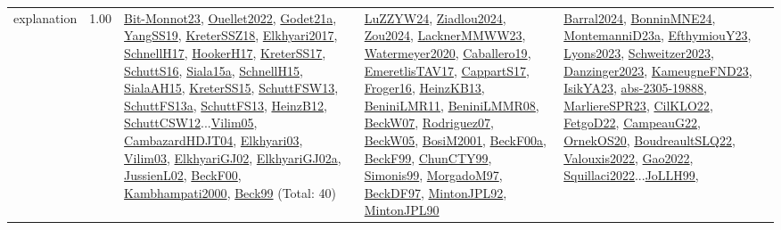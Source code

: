 {\begin{longtable}{p{3cm}r>{\raggedright\arraybackslash}p{6cm}>{\raggedright\arraybackslash}p{6cm}>{\raggedright\arraybackslash}p{8cm}}
\index{explanation}\index{Concepts!explanation}explanation &  1.00 & \hyperref[detail:Bit-Monnot23]{Bit-Monnot23}, \hyperref[detail:Ouellet2022]{Ouellet2022}, \hyperref[detail:Godet21a]{Godet21a}, \hyperref[detail:YangSS19]{YangSS19}, \hyperref[detail:KreterSSZ18]{KreterSSZ18}, \hyperref[detail:Elkhyari2017]{Elkhyari2017}, \hyperref[detail:SchnellH17]{SchnellH17}, \hyperref[detail:HookerH17]{HookerH17}, \hyperref[detail:KreterSS17]{KreterSS17}, \hyperref[detail:SchuttS16]{SchuttS16}, \hyperref[detail:Siala15a]{Siala15a}, \hyperref[detail:SchnellH15]{SchnellH15}, \hyperref[detail:SialaAH15]{SialaAH15}, \hyperref[detail:KreterSS15]{KreterSS15}, \hyperref[detail:SchuttFSW13]{SchuttFSW13}, \hyperref[detail:SchuttFS13a]{SchuttFS13a}, \hyperref[detail:SchuttFS13]{SchuttFS13}, \hyperref[detail:HeinzB12]{HeinzB12}, \hyperref[detail:SchuttCSW12]{SchuttCSW12}...\hyperref[detail:Vilim05]{Vilim05}, \hyperref[detail:CambazardHDJT04]{CambazardHDJT04}, \hyperref[detail:Elkhyari03]{Elkhyari03}, \hyperref[detail:Vilim03]{Vilim03}, \hyperref[detail:ElkhyariGJ02]{ElkhyariGJ02}, \hyperref[detail:ElkhyariGJ02a]{ElkhyariGJ02a}, \hyperref[detail:JussienL02]{JussienL02}, \hyperref[detail:BeckF00]{BeckF00}, \hyperref[detail:Kambhampati2000]{Kambhampati2000}, \hyperref[detail:Beck99]{Beck99} (Total: 40) & \hyperref[detail:LuZZYW24]{LuZZYW24}, \hyperref[detail:Ziadlou2024]{Ziadlou2024}, \hyperref[detail:Zou2024]{Zou2024}, \hyperref[detail:LacknerMMWW23]{LacknerMMWW23}, \hyperref[detail:Watermeyer2020]{Watermeyer2020}, \hyperref[detail:Caballero19]{Caballero19}, \hyperref[detail:EmeretlisTAV17]{EmeretlisTAV17}, \hyperref[detail:CappartS17]{CappartS17}, \hyperref[detail:Froger16]{Froger16}, \hyperref[detail:HeinzKB13]{HeinzKB13}, \hyperref[detail:BeniniLMR11]{BeniniLMR11}, \hyperref[detail:BeniniLMMR08]{BeniniLMMR08}, \hyperref[detail:BeckW07]{BeckW07}, \hyperref[detail:Rodriguez07]{Rodriguez07}, \hyperref[detail:BeckW05]{BeckW05}, \hyperref[detail:BosiM2001]{BosiM2001}, \hyperref[detail:BeckF00a]{BeckF00a}, \hyperref[detail:BeckF99]{BeckF99}, \hyperref[detail:ChunCTY99]{ChunCTY99}, \hyperref[detail:Simonis99]{Simonis99}, \hyperref[detail:MorgadoM97]{MorgadoM97}, \hyperref[detail:BeckDF97]{BeckDF97}, \hyperref[detail:MintonJPL92]{MintonJPL92}, \hyperref[detail:MintonJPL90]{MintonJPL90} & \hyperref[detail:Barral2024]{Barral2024}, \hyperref[detail:BonninMNE24]{BonninMNE24}, \hyperref[detail:MontemanniD23a]{MontemanniD23a}, \hyperref[detail:EfthymiouY23]{EfthymiouY23}, \hyperref[detail:Lyons2023]{Lyons2023}, \hyperref[detail:Schweitzer2023]{Schweitzer2023}, \hyperref[detail:Danzinger2023]{Danzinger2023}, \hyperref[detail:KameugneFND23]{KameugneFND23}, \hyperref[detail:IsikYA23]{IsikYA23}, \hyperref[detail:abs-2305-19888]{abs-2305-19888}, \hyperref[detail:MarliereSPR23]{MarliereSPR23}, \hyperref[detail:CilKLO22]{CilKLO22}, \hyperref[detail:FetgoD22]{FetgoD22}, \hyperref[detail:CampeauG22]{CampeauG22}, \hyperref[detail:OrnekOS20]{OrnekOS20}, \hyperref[detail:BoudreaultSLQ22]{BoudreaultSLQ22}, \hyperref[detail:Valouxis2022]{Valouxis2022}, \hyperref[detail:Gao2022]{Gao2022}, \hyperref[detail:Squillaci2022]{Squillaci2022}...\hyperref[detail:JoLLH99]{JoLLH99}, 
\end{longtable}}
